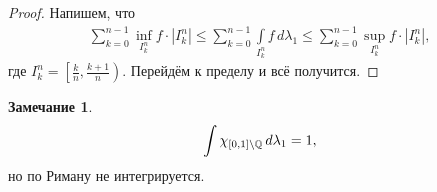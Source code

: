 \documentclass[a4paper,14pt]{extarticle}
\newcounter{theoremCnt}
\theoremstyle{definition}
\theoremstyle{plain}
\theoremstyle{plain}
\theoremstyle{plain}
\theoremstyle{plain}
\theoremstyle{definition}
\theoremstyle{definition}
\newtheorem{remrk}[theoremCnt]{Замечание}
\theoremstyle{definition}
\theoremstyle{definition}
\theoremstyle{definition}
\theoremstyle{definition}
\theoremstyle{plain}
\theoremstyle{plain}
\theoremstyle{plain}
\theoremstyle{plain}
\theoremstyle{definition}
\theoremstyle{definition}
\theoremstyle{definition}
\theoremstyle{definition}
\theoremstyle{definition}
\newcommand{\Q}{\ensuremath \mathbb{Q}}
\begin{document}
\begin{proof}
 Напишем, что \begin{align*}
  \sum_{k=0}^{n - 1} \inf_{I_k^{n}} f \cdot \left| I_k^{n} \right| \leqslant \sum_{k=0}^{n - 1} \int\limits_{I_k^{n}} f \, d\lambda_1 \leqslant \sum_{k=0}^{n - 1} \sup_{I_k^{n}} f \cdot \left| I_k^{n} \right|
 ,\end{align*}  где $I_k^{n} = \left[ \frac{k}{n}, \frac{k+1}{n} \right)$. Перейдём к пределу и всё получится.
\end{proof}
\begin{remrk}
 \begin{align*}
  \int\limits \chi_{[0,1] \setminus \Q} \, d\lambda_1 = 1
 ,\end{align*} но по Риману не интегрируется.
\end{remrk}
\end{document}
